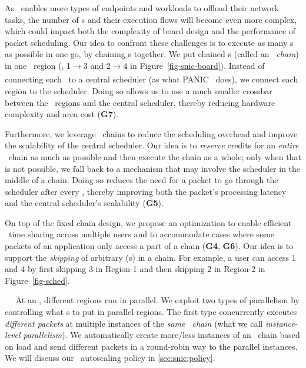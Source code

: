 As \snic\ enables more types of endpoints and workloads to offload their network tasks, the number of \nt{}s and their execution flows will become even more complex, which could impact both the complexity of board design and the performance of packet scheduling.
Our idea to confront these challenges is to execute as many \nt{}s as possible in one go, by chaining \nt{}s together.
We put chained \nt{}s (called an {\em \nt\ chain}) in one \nt\ region (\eg, \nt{}1$\xrightarrow[]{}$\nt{}3 and \nt{}2$\xrightarrow[]{}$\nt{}4 in Figure~\ref{fig-snic-board}).
Instead of connecting each \nt\ to a central scheduler (as what PANIC~\cite{panic-osdi20} does), we connect each region to the scheduler.
Doing so allows us to use a much smaller crossbar between the \nt\ regions and the central scheduler, thereby reducing hardware complexity and area cost (\textbf{G7}).

Furthermore, we leverage \nt\ chains to reduce the scheduling overhead and improve the scalability of the central scheduler.
Our idea is to {\em reserve} credits for an {\em entire} \nt\ chain as much as possible and then execute the chain as a whole; only when that is not possible, we fall back to a mechanism that may involve the scheduler in the middle of a chain. 
Doing so reduces the need for a packet to go through the scheduler after every \nt, thereby improving both the packet's processing latency and the central scheduler's scalability (\textbf{G5}).

On top of the fixed chain design, we propose an optimization to enable efficient \nt\ time sharing across multiple users and to accommodate cases where some packets of an application only access a part of a chain (\textbf{G4}, \textbf{G6}).
Our idea is to support the {\em skipping} of arbitrary \nt(s) in a chain.
For example, a user can access \nt{}1 and \nt{}4 by first skipping \nt{}3 in Region-1 and then skipping \nt{}2 in Region-2 in Figure~\ref{fig-sched}.


~~
At an \snic, different regions run in parallel.
We exploit two types of parallelism by controlling what \nt{}s to put in parallel regions.
The first type concurrently executes {\em different packets} at multiple instances of the {\em same \nt\ chain} (what we call {\em instance-level parallelism}).
We automatically create more/less instances of an \nt\ chain based on load and send different packets in a round-robin way to the parallel instances.
We will discuss our \nt\ autoscaling policy in \ref{sec:snic:policy}.


